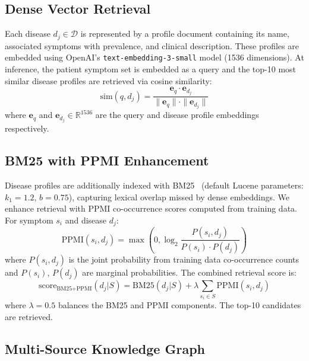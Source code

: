 \documentclass[runningheads]{llncs}
\begin{document}
\subsection{Dense Vector Retrieval}
\label{sec:dense}

Each disease $d_j \in \mathcal{D}$ is represented by a profile document containing its name, associated symptoms with prevalence, and clinical description. These profiles are embedded using OpenAI's \texttt{text-embedding-3-small} model (1536 dimensions). At inference, the patient symptom set is embedded as a query and the top-10 most similar disease profiles are retrieved via cosine similarity:
\begin{equation}
    \text{sim}(q, d_j) = \frac{\mathbf{e}_q \cdot \mathbf{e}_{d_j}}{\|\mathbf{e}_q\| \cdot \|\mathbf{e}_{d_j}\|}
\end{equation}
where $\mathbf{e}_q$ and $\mathbf{e}_{d_j} \in \mathbb{R}^{1536}$ are the query and disease profile embeddings respectively.

\subsection{BM25 with PPMI Enhancement}
\label{sec:bm25}

Disease profiles are additionally indexed with BM25~\cite{robertson2009probabilistic} (default Lucene parameters: $k_1{=}1.2$, $b{=}0.75$), capturing lexical overlap missed by dense embeddings. We enhance retrieval with PPMI co-occurrence scores computed from training data. For symptom $s_i$ and disease $d_j$:
\begin{equation}
    \text{PPMI}(s_i, d_j) = \max\left(0, \log_2 \frac{P(s_i, d_j)}{P(s_i) \cdot P(d_j)}\right)
\end{equation}
where $P(s_i, d_j)$ is the joint probability from training data co-occurrence counts and $P(s_i)$, $P(d_j)$ are marginal probabilities. The combined retrieval score is:
\begin{equation}
    \text{score}_{\text{BM25+PPMI}}(d_j | S) = \text{BM25}(d_j | S) + \lambda \sum_{s_i \in S} \text{PPMI}(s_i, d_j)
\end{equation}
where $\lambda = 0.5$ balances the BM25 and PPMI components. The top-10 candidates are retrieved.

\subsection{Multi-Source Knowledge Graph}
\label{sec:kg}
\end{document}
